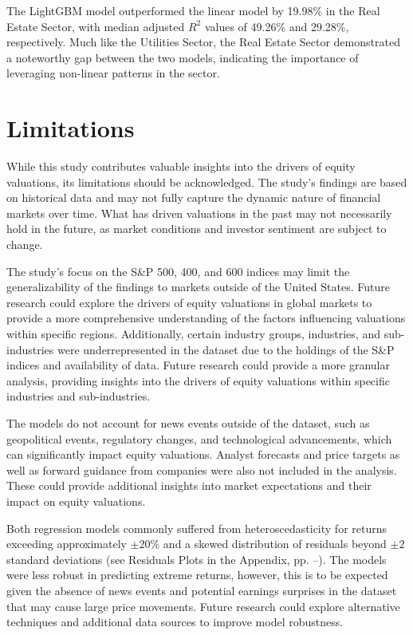 \documentclass[12pt,a4paper,english]{article}
\begin{document}
The LightGBM model outperformed the linear model by 19.98\% in the Real Estate Sector, with median adjusted $R^2$ values of 49.26\% and 29.28\%, respectively. Much like the Utilities Sector, the Real Estate Sector demonstrated a noteworthy gap between the two models, indicating the importance of leveraging non-linear patterns in the sector.


\section{Limitations}
\label{sec:limitations}

While this study contributes valuable insights into the drivers of equity valuations, its limitations should be acknowledged. The study's findings are based on historical data and may not fully capture the dynamic nature of financial markets over time. What has driven valuations in the past may not necessarily hold in the future, as market conditions and investor sentiment are subject to change.

The study's focus on the S\&P 500, 400, and 600 indices may limit the generalizability of the findings to markets outside of the United States. Future research could explore the drivers of equity valuations in global markets to provide a more comprehensive understanding of the factors influencing valuations within specific regions. Additionally, certain industry groups, industries, and sub-industries were underrepresented in the dataset due to the holdings of the S\&P indices and availability of data. Future research could provide a more granular analysis, providing insights into the drivers of equity valuations within specific industries and sub-industries.

The models do not account for news events outside of the dataset, such as geopolitical events, regulatory changes, and technological advancements, which can significantly impact equity valuations. Analyst forecasts and price targets as well as forward guidance from companies were also not included in the analysis. These could provide additional insights into market expectations and their impact on equity valuations.

Both regression models commonly suffered from heteroscedasticity for returns exceeding approximately $\pm 20\%$ and a skewed distribution of residuals beyond $\pm 2$ standard deviations (see Residuals Plots in the Appendix, pp. \pageref{fig:Energy Sector-resid}--\pageref{fig:Real Estate Sector-resid}). The models were less robust in predicting extreme returns, however, this is to be expected given the absence of news events and potential earnings surprises in the dataset that may cause large price movements. Future research could explore alternative techniques and additional data sources to improve model robustness.
\end{document}
